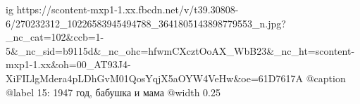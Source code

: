  
 
 
 
 

\ifcmt
  ig https://scontent-mxp1-1.xx.fbcdn.net/v/t39.30808-6/270232312_10226583945494788_3641805143898779553_n.jpg?_nc_cat=102&ccb=1-5&_nc_sid=b9115d&_nc_ohc=hfwmCXcztOoAX_WbB23&_nc_ht=scontent-mxp1-1.xx&oh=00_AT93J4-XiFILlgMdera4pLDhGvM01QosYqjX5aOYW4VeHw&oe=61D7617A
	@caption @label 15: 1947 год, бабушка и мама
  @width 0.25
\fi
